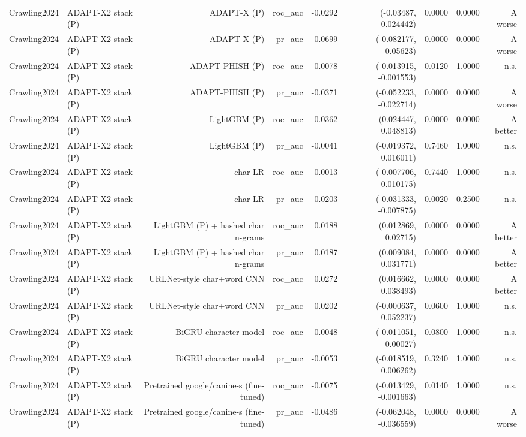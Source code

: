 \begin{table}[t]
\begin{tabular}{llrrrrrrr}
Crawling2024 & ADAPT-X2 stack (P) & ADAPT-X (P) & roc\_auc & -0.0292 & (-0.03487, -0.024442) & 0.0000 & 0.0000 & A worse \\
Crawling2024 & ADAPT-X2 stack (P) & ADAPT-X (P) & pr\_auc & -0.0699 & (-0.082177, -0.05623) & 0.0000 & 0.0000 & A worse \\
Crawling2024 & ADAPT-X2 stack (P) & ADAPT-PHISH (P) & roc\_auc & -0.0078 & (-0.013915, -0.001553) & 0.0120 & 1.0000 & n.s. \\
Crawling2024 & ADAPT-X2 stack (P) & ADAPT-PHISH (P) & pr\_auc & -0.0371 & (-0.052233, -0.022714) & 0.0000 & 0.0000 & A worse \\
Crawling2024 & ADAPT-X2 stack (P) & LightGBM (P) & roc\_auc & 0.0362 & (0.024447, 0.048813) & 0.0000 & 0.0000 & A better \\
Crawling2024 & ADAPT-X2 stack (P) & LightGBM (P) & pr\_auc & -0.0041 & (-0.019372, 0.016011) & 0.7460 & 1.0000 & n.s. \\
Crawling2024 & ADAPT-X2 stack (P) & char-LR & roc\_auc & 0.0013 & (-0.007706, 0.010175) & 0.7440 & 1.0000 & n.s. \\
Crawling2024 & ADAPT-X2 stack (P) & char-LR & pr\_auc & -0.0203 & (-0.031333, -0.007875) & 0.0020 & 0.2500 & n.s. \\
Crawling2024 & ADAPT-X2 stack (P) & LightGBM (P) + hashed char n-grams & roc\_auc & 0.0188 & (0.012869, 0.02715) & 0.0000 & 0.0000 & A better \\
Crawling2024 & ADAPT-X2 stack (P) & LightGBM (P) + hashed char n-grams & pr\_auc & 0.0187 & (0.009084, 0.031771) & 0.0000 & 0.0000 & A better \\
Crawling2024 & ADAPT-X2 stack (P) & URLNet-style char+word CNN & roc\_auc & 0.0272 & (0.016662, 0.038493) & 0.0000 & 0.0000 & A better \\
Crawling2024 & ADAPT-X2 stack (P) & URLNet-style char+word CNN & pr\_auc & 0.0202 & (-0.000637, 0.052237) & 0.0600 & 1.0000 & n.s. \\
Crawling2024 & ADAPT-X2 stack (P) & BiGRU character model & roc\_auc & -0.0048 & (-0.011051, 0.00027) & 0.0800 & 1.0000 & n.s. \\
Crawling2024 & ADAPT-X2 stack (P) & BiGRU character model & pr\_auc & -0.0053 & (-0.018519, 0.006262) & 0.3240 & 1.0000 & n.s. \\
Crawling2024 & ADAPT-X2 stack (P) & Pretrained google/canine-s (fine-tuned) & roc\_auc & -0.0075 & (-0.013429, -0.001663) & 0.0140 & 1.0000 & n.s. \\
Crawling2024 & ADAPT-X2 stack (P) & Pretrained google/canine-s (fine-tuned) & pr\_auc & -0.0486 & (-0.062048, -0.036559) & 0.0000 & 0.0000 & A worse \\

\end{tabular}
\end{table}
